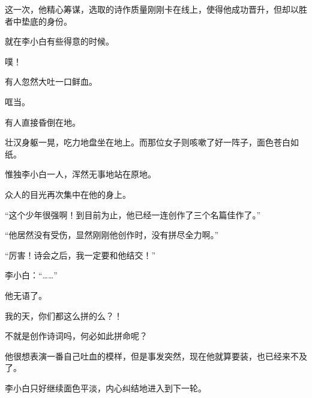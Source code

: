 \begin{this_body}
这一次，他精心筹谋，选取的诗作质量刚刚卡在线上，使得他成功晋升，但却以胜者中垫底的身份。

就在李小白有些得意的时候。

噗！

有人忽然大吐一口鲜血。

哐当。

有人直接昏倒在地。

壮汉身躯一晃，吃力地盘坐在地上。而那位女子则咳嗽了好一阵子，面色苍白如纸。

惟独李小白一人，浑然无事地站在原地。

众人的目光再次集中在他的身上。

“这个少年很强啊！到目前为止，他已经一连创作了三个名篇佳作了。”

“他居然没有受伤，显然刚刚他创作时，没有拼尽全力啊。”

“厉害！诗会之后，我一定要和他结交！”

李小白：“……”

他无语了。

我的天，你们都这么拼的么？！

不就是创作诗词吗，何必如此拼命呢？

他很想表演一番自己吐血的模样，但是事发突然，现在他就算要装，也已经来不及了。

李小白只好继续面色平淡，内心纠结地进入到下一轮。

\end{this_body}

